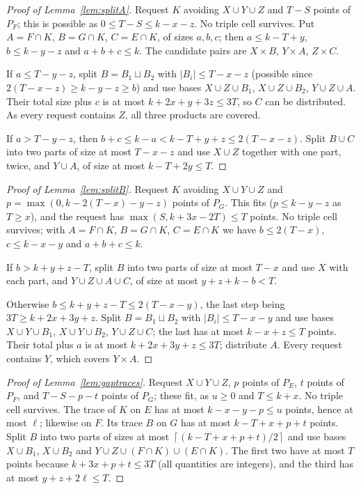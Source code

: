 \documentclass[11pt]{article}
\numberwithin{equation}{section}
\theoremstyle{definition}
\theoremstyle{remark}
\newcommand{\ceil}[1]{\left\lceil #1\right\rceil}
\begin{document}
\begin{proof}[Proof of Lemma~\ref{lem:splitA}]
Request $K$ avoiding $X\cup Y\cup Z$ and $T-S$ points of $P_F$; this is
possible as $0\le T-S\le k-x-z$. No triple cell survives. Put
$A=F\cap K$, $B=G\cap K$, $C=E\cap K$, of sizes $a,b,c$; then
$a\le k-T+y$, $b\le k-y-z$ and $a+b+c\le k$. The candidate pairs are
$X\times B$, $Y\times A$, $Z\times C$.

If $a\le T-y-z$, split $B=B_1\sqcup B_2$ with $|B_i|\le T-x-z$ (possible
since $2(T-x-z)\ge k-y-z\ge b$) and use bases $X\cup Z\cup B_1$,
$X\cup Z\cup B_2$, $Y\cup Z\cup A$. Their total size plus $c$ is at most
$k+2x+y+3z\le3T$, so $C$ can be distributed. As every request contains
$Z$, all three products are covered.

If $a>T-y-z$, then $b+c\le k-a<k-T+y+z\le2(T-x-z)$. Split $B\cup C$ into
two parts of size at most $T-x-z$ and use $X\cup Z$ together with one
part, twice, and $Y\cup A$, of size at most $k-T+2y\le T$.
\end{proof}

\begin{proof}[Proof of Lemma~\ref{lem:splitB}]
Request $K$ avoiding $X\cup Y\cup Z$ and $p=\max(0,k-2(T-x)-y-z)$ points of
$P_G$. This fits ($p\le k-y-z$ as $T\ge x$), and the request has
$\max(S,k+3x-2T)\le T$ points. No triple cell survives; with
$A=F\cap K$, $B=G\cap K$, $C=E\cap K$ we have $b\le2(T-x)$,
$c\le k-x-y$ and $a+b+c\le k$.

If $b>k+y+z-T$, split $B$ into two parts of size at most $T-x$ and use
$X$ with each part, and $Y\cup Z\cup A\cup C$, of size at most
$y+z+k-b<T$.

Otherwise $b\le k+y+z-T\le2(T-x-y)$, the last step being
$3T\ge k+2x+3y+z$. Split $B=B_1\sqcup B_2$ with $|B_i|\le T-x-y$ and use
bases $X\cup Y\cup B_1$, $X\cup Y\cup B_2$, $Y\cup Z\cup C$; the last has
at most $k-x+z\le T$ points. Their total plus $a$ is at most
$k+2x+3y+z\le3T$; distribute $A$. Every request contains $Y$, which
covers $Y\times A$.
\end{proof}

\begin{proof}[Proof of Lemma~\ref{lem:gaptraces}]
Request $X\cup Y\cup Z$, $p$ points of $P_E$, $t$ points of $P_F$, and
$T-S-p-t$ points of $P_G$; these fit, as $u\ge0$ and $T\le k+x$. No
triple cell survives. The trace of $K$ on $E$ has at most
$k-x-y-p\le u$ points, hence at most $\ell$; likewise on $F$. Its trace
$B$ on $G$ has at most $k-T+x+p+t$ points. Split $B$ into two parts of
sizes at most $\ceil{(k-T+x+p+t)/2}$ and use bases $X\cup B_1$,
$X\cup B_2$ and $Y\cup Z\cup(F\cap K)\cup(E\cap K)$. The first two have
at most $T$ points because $k+3x+p+t\le3T$ (all quantities are
integers), and the third has at most $y+z+2\ell\le T$.
\end{proof}
\end{document}

